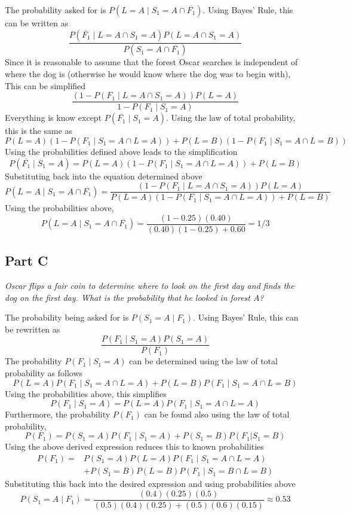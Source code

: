 \documentclass{article}
\begin{document}
The probability asked for is $ P(L = A \mid S_1 = A \cap \overline{F_1}) $.
Using Bayes' Rule, this can be written as
$$ \frac{ P(\overline{F_1} \mid L = A \cap S_1 = A) P(L = A \cap S_1 = A) }{
    P(S_1 = A \cap \overline{F_1}) } $$
Since it is reasonable to assume that the forest Oscar searches is independent
of where the dog is (otherwise he would know where the dog was to begin with),
This can be simplified
$$ \frac{ (1 - P(F_1 \mid L = A \cap S_1 = A)) P(L = A) }{ 1 - P(F_1 \mid S_1 =
A) } $$
Everything is know except $ P(\overline{F_1} \mid S_1 = A) $. Using the law of
total probability, this is the same as
$$ P(L = A) (1 - P(F_1 \mid S_1 = A \cap L = A)) + P(L = B) (1 - P(F_1 \mid S_1
= A \cap L = B)) $$
Using the probabilities defined above leads to the simplification
$$ P(\overline{F_1} \mid S_1 = A) = P(L = A) (1 - P(F_1 \mid S_1 = A \cap L =
A)) + P(L = B) $$
Substituting back into the equation determined above
$$ P(L = A \mid S_1 = A \cap \overline{F_1}) = \frac{ (1 - P(F_1 \mid L =
A \cap S_1 = A)) P(L = A) }{ P(L = A) (1 - P(F_1 \mid S_1 = A \cap L = A)) + P(L
= B) } $$
Using the probabilities above,
$$ P(L = A \mid S_1 = A \cap \overline{F_1}) = \frac{ (1 - 0.25) (0.40) }{
    (0.40) (1 - 0.25) + 0.60 } = 1/3 $$

\subsection*{Part C}

\textit{Oscar flips a fair coin to determine where to look on the first day and
finds the dog on the first day. What is the probability that he looked in forest
$ A $?}

\bigbreak

The probability being asked for is $ P(S_1 = A \mid F_1) $. Using Bayes' Rule,
this can be rewritten as
$$ \frac{ P(F_1 \mid S_1 = A) P(S_1 = A) }{ P(F_1) } $$
The probability $ P(F_1 \mid S_1 = A) $ can be determined using the law of total
probability as follows
$$ P(L = A) P(F_1 \mid S_1 = A \cap L = A) + P(L = B)
P(F_1 \mid S_1 = A \cap L = B) $$
Using the probabilities above, this simplifies
$$ P(F_1 \mid S_1 = A) = P(L = A) P(F_1 \mid S_1 = A \cap L = A) $$
Furthermore, the probability $ P(F_1) $ can be found also using the law of total
probability,
$$ P(F_1) = P(S_1 = A) P(F_1 \mid S_1 = A) + P(S_1 = B) P(F_1 | S_1 = B) $$
Using the above derived expression reduces this to known probabilities
\begin{align*}
    P(F_1) = &P(S_1 = A) P(L = A) P(F_1 \mid S_1 = A \cap L = A) \\
    &+ P(S_1 = B) P(L = B) P(F_1 \mid S_1 = B \cap L = B)
\end{align*}
Substituting this back into the desired expression and using probabilities above
$$ P(S_1 = A \mid F_1) = \frac{ (0.4) (0.25) (0.5) }{ (0.5)(0.4)(0.25) +
(0.5)(0.6)(0.15) } \approx 0.53 $$
\end{document}
